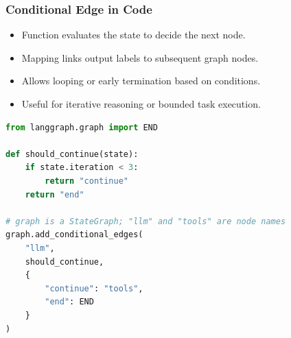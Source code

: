 \begin{frame}[fragile]\frametitle{Conditional Edge in Code}
\begin{itemize}
  \item Function evaluates the state to decide the next node.
  \item Mapping links output labels to subsequent graph nodes.
  \item Allows looping or early termination based on conditions.
  \item Useful for iterative reasoning or bounded task execution.
\end{itemize}

\begin{lstlisting}[language=Python, basicstyle=\scriptsize\ttfamily]
from langgraph.graph import END

def should_continue(state):
    if state.iteration < 3:
        return "continue"
    return "end"

# graph is a StateGraph; "llm" and "tools" are node names
graph.add_conditional_edges(
    "llm",
    should_continue,
    {
        "continue": "tools",
        "end": END
    }
)
\end{lstlisting}


\end{frame}
